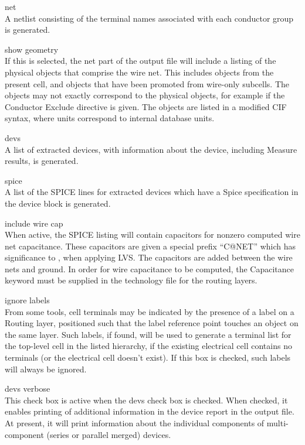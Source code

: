 \begin{description}
\item{\cb net}\\
A netlist consisting of the terminal names associated with each
conductor group is generated.

\item{\et show geometry}\\
If this is selected, the {\cb net} part of the output file will
include a listing of the physical objects that comprise the wire net. 
This includes objects from the present cell, and objects that have
been promoted from wire-only subcells.  The objects may not exactly
correspond to the physical objects, for example if the {\et Conductor
Exclude} directive is given.  The objects are listed in a modified CIF
syntax, where units correspond to internal database units.

\item{\cb devs}\\
A list of extracted devices, with information about the device,
including {\et Measure} results, is generated.

\item{\cb spice}\\
A list of the SPICE lines for extracted devices which have a {\et
Spice} specification in the device block is generated.

\item{\cb include wire cap}\\
When active, the SPICE listing will contain capacitors for nonzero
computed wire net capacitance.  These capacitors are given a special
prefix ``{\vt C@NET}'' which has significance to {\Xic}, when applying
LVS.  The capacitors are added between the wire nets and ground.  In
order for wire capacitance to be computed, the {\et Capacitance}
keyword must be supplied in the technology file for the routing
layers.

\item{\cb ignore labels}\\
From some tools, cell terminals may be indicated by the presence of a
label on a {\et Routing} layer, positioned such that the label
reference point touches an object on the same layer.  Such labels, if
found, will be used to generate a terminal list for the top-level cell
in the listed hierarchy, if the existing electrical cell contains no
terminals (or the electrical cell doesn't exist).  If this box is
checked, such labels will always be ignored.

\item{\cb devs verbose}\\
This check box is active when the {\cb devs} check box is checked. 
When checked, it enables printing of additional information in the
device report in the output file.  At present, it will print
information about the individual components of multi-component (series
or parallel merged) devices.
\end{description}

